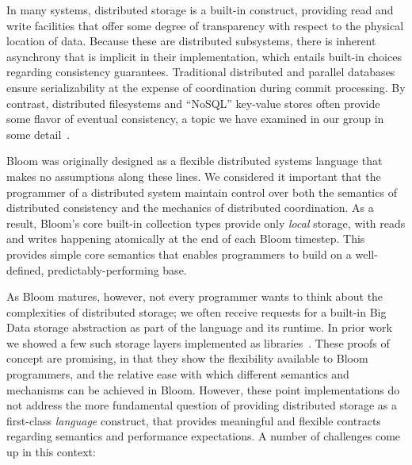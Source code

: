In many systems, distributed storage is a built-in construct, providing read and write facilities that offer some degree of transparency with respect to the physical location of data.  Because these are distributed subsystems, there is inherent asynchrony that is implicit in their implementation, which  entails built-in choices regarding consistency guarantees. Traditional distributed and parallel databases ensure serializability at the expense of coordination during commit processing.  By contrast, distributed filesystems and ``NoSQL'' key-value stores often provide some flavor of eventual consistency, a topic we have examined in our group in some detail~\cite{bailis}.

Bloom was originally designed as a flexible distributed systems language that makes no assumptions along these lines.  We considered it important that the  programmer of a distributed system maintain control over both the semantics of distributed consistency and the mechanics of distributed coordination.  As a result, Bloom's core built-in collection types provide only \emph{local} storage, with reads and writes happening atomically at the end of each Bloom timestep.  This provides simple core semantics that enables programmers to build on a well-defined, predictably-performing base.

As Bloom matures, however, not every programmer wants to think about the complexities of distributed storage; we often receive requests for a built-in Big Data storage abstraction as part of the language and its runtime.  In prior work we showed a few such storage layers implemented as libraries~\cite{boomanalytics,sandbox}.  These proofs of concept are promising, in that they show the flexibility available to Bloom programmers, and the relative ease with which different semantics and mechanisms can be achieved in Bloom.  However, these point implementations do not address the more fundamental question of providing distributed storage as a first-class \emph{language} construct, that provides meaningful and flexible contracts regarding semantics and performance expectations.   A number of challenges come up in this context:

